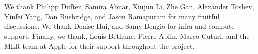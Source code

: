 \section*{} We thank Philipp Dufter, Samira Abnar, Xiujun
Li, Zhe Gan, Alexander Toshev, Yinfei Yang, Dan Busbridge, and Jason Ramapuram
for many fruitful discussions. We thank Denise Hui, and Samy Bengio for infra
and compute support. Finally, we thank, Louis Béthune, Pierre Ablin, Marco
Cuturi, and the MLR team at Apple for their support throughout the project.
